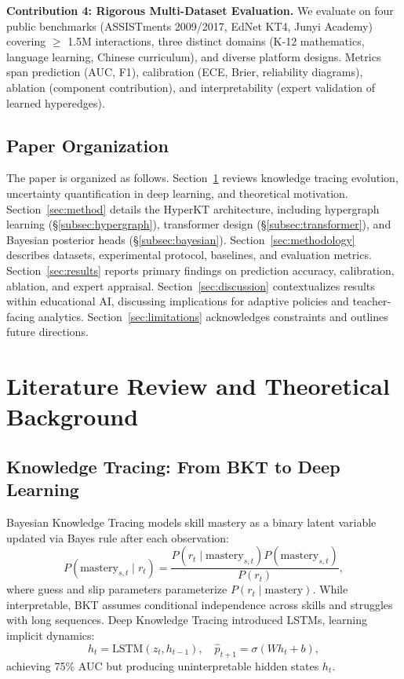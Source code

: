 \documentclass[preprint,12pt]{elsarticle}
\begin{document}
\textbf{Contribution 4: Rigorous Multi-Dataset Evaluation.} We evaluate on four public benchmarks (ASSISTments 2009/2017, EdNet KT4, Junyi Academy) covering $\geq$ 1.5M interactions, three distinct domains (K-12 mathematics, language learning, Chinese curriculum), and diverse platform designs. Metrics span prediction (AUC, F1), calibration (ECE, Brier, reliability diagrams), ablation (component contribution), and interpretability (expert validation of learned hyperedges).

\subsection{Paper Organization}

The paper is organized as follows. Section~\ref{sec:literature} reviews knowledge tracing evolution, uncertainty quantification in deep learning, and theoretical motivation. Section~\ref{sec:method} details the HyperKT architecture, including hypergraph learning (\S\ref{subsec:hypergraph}), transformer design (\S\ref{subsec:transformer}), and Bayesian posterior heads (\S\ref{subsec:bayesian}). Section~\ref{sec:methodology} describes datasets, experimental protocol, baselines, and evaluation metrics. Section~\ref{sec:results} reports primary findings on prediction accuracy, calibration, ablation, and expert appraisal. Section~\ref{sec:discussion} contextualizes results within educational AI, discussing implications for adaptive policies and teacher-facing analytics. Section~\ref{sec:limitations} acknowledges constraints and outlines future directions.

\section{Literature Review and Theoretical Background}\label{sec:literature}

\subsection{Knowledge Tracing: From BKT to Deep Learning}

Bayesian Knowledge Tracing \cite{corbett1994} models skill mastery as a binary latent variable updated via Bayes rule after each observation:
\begin{equation}
P(\text{mastery}_{s,t} \mid r_t) = \frac{P(r_t \mid \text{mastery}_{s,t}) P(\text{mastery}_{s,t})}{P(r_t)},
\end{equation}
where guess and slip parameters parameterize $P(r_t \mid \text{mastery})$. While interpretable, BKT assumes conditional independence across skills and struggles with long sequences. Deep Knowledge Tracing \cite{piech2015} introduced LSTMs, learning implicit dynamics:
\begin{equation}
h_t = \text{LSTM}(z_t, h_{t-1}), \quad \hat{p}_{t+1} = \sigma(W h_t + b),
\end{equation}
achieving 75\% AUC but producing uninterpretable hidden states $h_t$.
\end{document}
